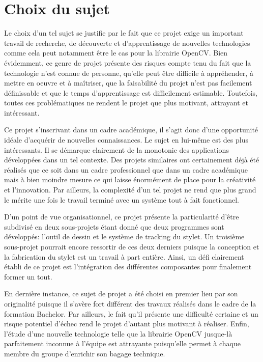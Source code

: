 \documentclass[11pt,a4paper,oldfontcommands]{memoir}
\begin{document}
\section{Choix du sujet}

Le choix d'un tel sujet se justifie par le fait que ce projet exige un important travail de recherche, de découverte et d'apprentissage de nouvelles technologies comme cela peut notamment être le cas pour la librairie OpenCV. Bien évidemment, ce genre de projet présente des risques compte tenu du fait que la technologie n'est connue de personne, qu'elle peut être difficile à appréhender, à mettre en oeuvre et à maîtriser, que la faisabilité du projet n'est pas facilement définissable et que le temps d'apprentissage est difficilement estimable. Toutefois, toutes ces problématiques ne rendent le projet que plus motivant, attrayant et intéressant.

Ce projet s'inscrivant dans un cadre académique, il s'agit donc d'une opportunité idéale d'acquérir de nouvelles connaissances. Le sujet en lui-même est des plus intéressants. Il se démarque clairement de la monotonie des applications développées dans un tel contexte. Des projets similaires ont certainement déjà été réalisés que ce soit dans un cadre professionnel que dans un cadre académique mais à bien moindre mesure ce qui laisse énormément de place pour la créativité et l'innovation. Par ailleurs, la complexité d'un tel projet ne rend que plus grand le mérite une fois le travail terminé avec un système tout à fait fonctionnel.

D'un point de vue organisationnel, ce projet présente la particularité d'être subdivisé en deux sous-projets étant donné que deux programmes sont développés: l'outil de dessin et le système de tracking du stylet. Un troisième sous-projet pourrait encore ressortir de ces deux derniers puisque la conception et la fabrication du stylet est un travail à part entière. Ainsi, un défi clairement établi de ce projet est l'intégration des différentes composantes pour finalement former un tout.

En dernière instance, ce sujet de projet a été choisi en premier lieu par son originalité puisque il s'avère fort différent des travaux réalisés dans le cadre de la formation Bachelor. Par ailleurs, le fait qu'il présente une difficulté certaine et un risque potentiel d'échec rend le projet d'autant plus motivant à réaliser. Enfin, l'étude d'une nouvelle technologie telle que la librairie OpenCV jusque-là parfaitement inconnue à l'équipe est attrayante puisqu'elle permet à chaque membre du groupe d'enrichir son bagage technique.
\end{document}
